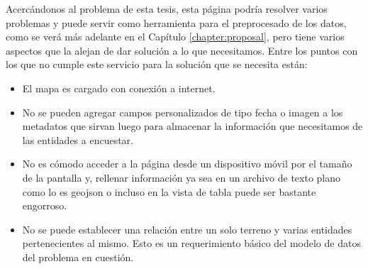 Acercándonos al problema de esta tesis, esta página podría resolver varios problemas y puede servir como herramienta para el preprocesado de los datos, como se verá más
adelante en el Capítulo \ref{chapter:proposal}, pero tiene varios aspectos que la alejan de dar solución a lo que necesitamos. Entre los puntos con los que no cumple este servicio
para la solución que se necesita están:
\begin{itemize}
    \item El mapa es cargado con conexión a internet.
    \item No se pueden agregar campos personalizados de tipo fecha o imagen a los metadatos que sirvan luego para almacenar la información que necesitamos de las entidades a encuestar.
    \item No es cómodo acceder a la página desde un dispositivo móvil por el tamaño de la pantalla y, rellenar información ya sea en un archivo de texto plano como lo es geojson o incluso en la vista de tabla puede ser bastante engorroso.
    \item No se puede establecer una relación entre un solo terreno y varias entidades pertenecientes al mismo. Esto es un requerimiento básico del modelo de datos del problema en cuestión.
\end{itemize}






